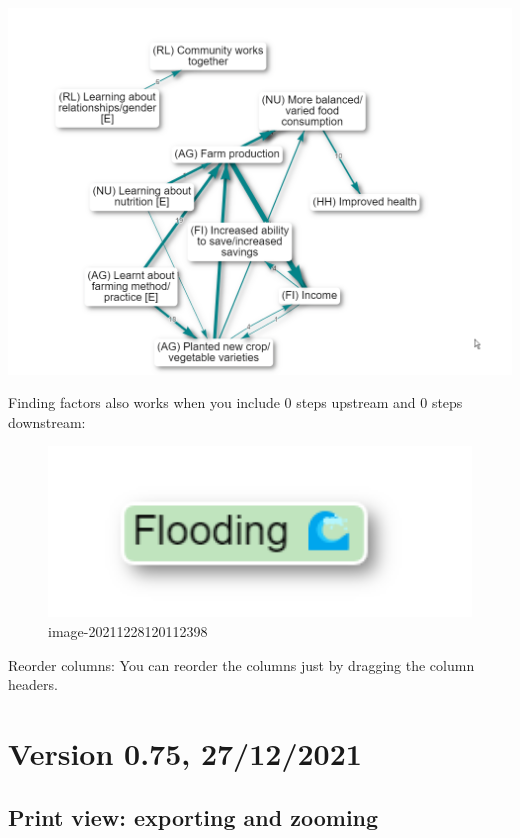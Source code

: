\documentclass[
]{book}
\begin{document}
\includegraphics{_assets/BhOlErDmwB.gif}

Finding factors also works when you include 0 steps upstream and 0 steps downstream:

\begin{figure}
\centering
\includegraphics[width=6.77083in,height=\textheight]{_assets/image-20211228120112398.png}
\caption{image-20211228120112398}
\end{figure}

Reorder columns: You can reorder the columns just by dragging the column headers.

\hypertarget{version-0.75-27122021}{%
\section{Version 0.75, 27/12/2021}\label{version-0.75-27122021}}

\hypertarget{print-view-exporting-and-zooming}{%
\subsection{Print view: exporting and zooming}\label{print-view-exporting-and-zooming}}
\end{document}
